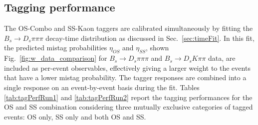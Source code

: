 %
%
%
%

\subsection{Tagging performance}
\label{subsec:TaggingComparison}

The OS-Combo and SS-Kaon taggers are calibrated simultaneously by fitting the $B_s \to D_s \pi\pi\pi$ decay-time distribution as discussed in Sec.~\ref{sec:timeFit}.
In this fit, the predicted mistag probabilities $\eta_{OS}$ and $\eta_{SS}$, shown Fig.~\ref{fig:w_data_comparison} for $B_s \to D_s \pi\pi\pi$ and $B_s \to D_s K\pi\pi$ data,
are included as per-event observables, effectively giving a larger weight to the events that have a lower mistag probability.
The tagger responses are combined into a single response on an event-by-event basis during the fit.
Tables \ref{tab:tagPerfRun1} and \ref{tab:tagPerfRun2} report the tagging performances for the OS and SS combination 
considering three mutually exclusive categories of tagged events: OS only, SS only and both OS and SS.


